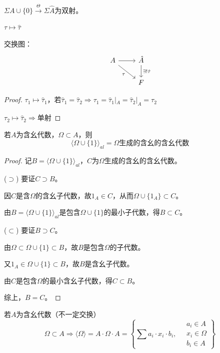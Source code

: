 \documentclass[lang=cn,a4paper,newtx,section]{elegantbook}
\begin{document}
\begin{proposition}
  $\Sigma A \cup \{0\} \xrightarrow{\Theta} \Sigma \hat{A}$为双射。
  
  $\tau \longmapsto \hat{\tau}$
  
  交换图：
  \begin{equation*}
    \begin{tikzcd}
      A \arrow[r] \arrow[dr, "\tau"'] & \hat{A} \arrow[d, "\exists! \hat{\tau}"] \\
      & F
    \end{tikzcd}
  \end{equation*}
\end{proposition}

\begin{proof}
  $\tau_1 \longmapsto \hat{\tau}_1$，若$\hat{\tau}_1 = \hat{\tau}_2 \Rightarrow \tau_1 = \hat{\tau}_1|_A = \hat{\tau}_2|_A = \tau_2$
  
  $\tau_2 \longmapsto \hat{\tau}_2 \Rightarrow$单射
\end{proof}

\begin{proposition}
  若$A$为含幺代数，$\Omega \subset A$，则
  \begin{equation*}
    \langle \Omega \cup \{1\} \rangle_{al} = \Omega\text{生成的含幺的含幺代数}
  \end{equation*}
\end{proposition}

\begin{proof}
  记$B = \langle \Omega \cup \{1\} \rangle_{al}$，$C$为$\Omega$生成的含幺的含幺代数。
  
  ($\supset$) 要证$C \supset B$。
  
  因$C$是含$\Omega$的含幺子代数，故$1_A \in C$，从而$\Omega \cup \{1_A\} \subset C$。
  
  由$B = \langle \Omega \cup \{1\} \rangle_{al}$是包含$\Omega \cup \{1\}$的最小子代数，得$B \subset C$。
  
  ($\subset$) 要证$B \supset C$。
  
  由$\Omega \subset \Omega \cup \{1\} \subset B$，故$B$是包含$\Omega$的子代数。
  
  又$1_A \in \Omega \cup \{1\} \subset B$，故$B$是含幺子代数。
  
  由$C$是包含$\Omega$的最小含幺子代数，得$C \subset B$。
  
  综上，$B = C$。
\end{proof}

\begin{proposition}
  若$A$为含幺代数（不一定交换）
  \begin{equation*}
    \Omega \subset A \Rightarrow \langle \Omega \rangle = A \cdot \Omega \cdot A = \left\{\sum a_i \cdot x_i \cdot b_i, \quad \substack{a_i \in A \\ x_i \in \Omega \\ b_i \in A}\right\}
  \end{equation*}
\end{proposition}
\end{document}
